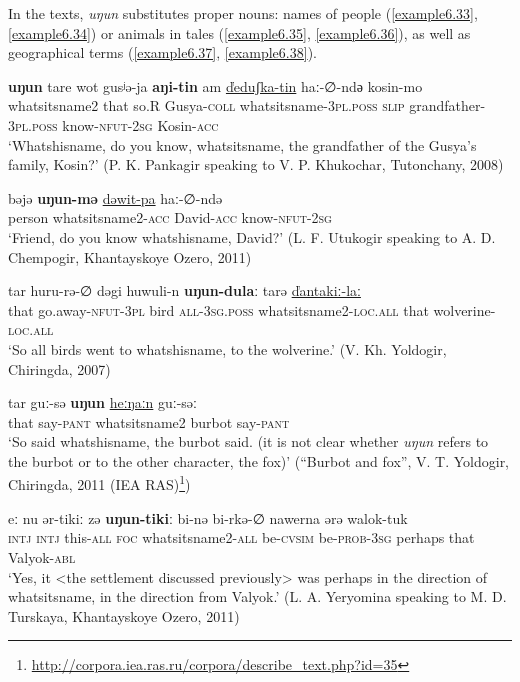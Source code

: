 \documentclass[output=paper,colorlinks,citecolor=brown]{langscibook}
\begin{document}
In the texts, \textit{uŋun} substitutes proper nouns: names of people (\ref{example6.33}, \ref{example6.34}) or animals in tales (\ref{example6.35}, \ref{example6.36}), as well as geographical terms (\ref{example6.37}, \ref{example6.38}).

\ea
    \label{example6.33}
    \gll \textbf{uŋun}	tare	wot	gusʲə-ja	\textbf{aŋi-tin} am	\uline{ďeduʃka-tin}	haː-∅-ndә	kosin-mo\\
    whatsitsname2	that	so.R	Gusya-\textsc{coll}	whatsitsname-\textsc{3pl.poss}  \textsc{slip}	grandfather-\textsc{3pl.poss}	know-\textsc{nfut}-2\textsc{sg}	Kosin-\textsc{acc}\\
    \glt `Whatshisname, do you know, whatsitsname, the grandfather of the Gusya’s family, Kosin?' (P. K. Pankagir speaking to V. P. Khukochar, Tutonchany, 2008)\\
    \z

\ea
    \label{example6.34}
    \gll bəjə	\textbf{uŋun-mə}	\uline{dəwit-pa}	haː-∅-ndə\\
    person	whatsitsname2-\textsc{acc}	David-\textsc{acc}	know-\textsc{nfut}-2\textsc{sg}\\
    \glt `Friend, do you know whatshisname, David?' (L. F. Utukogir speaking to A. D. Chempogir, Khantayskoye Ozero, 2011)\\
    \z

\ea
    \label{example6.35}
    \gll tar	huru-rə-∅	dəgi	huwuli-n	\textbf{uŋun-dulaː}	tarə    \uline{ďantakiː-laː}\\
    that	go.away-\textsc{nfut}-3\textsc{pl}	bird	\textsc{all}-\textsc{3sg.poss}	whatsitsname2-\textsc{loc.all}	that    wolverine-\textsc{loc.all}\\
    \glt `So all birds went to whatshisname, to the wolverine.' (V. Kh. Yoldogir, Chiringda, 2007)\\
    \z

\ea
    \label{example6.36}
    \gll tar	guː-sə	\textbf{uŋun}	\uline{heːŋaːn}	guː-səː\\
    that	say-\textsc{pant}	whatsitsname2	burbot	say-\textsc{pant}\\
    \glt `So said whatshisname, the burbot said. (it is not clear whether \textit{uŋun} refers to the burbot or to the other character, the fox)’ (“Burbot and fox”, V. T. Yoldogir, Chiringda, 2011 (IEA RAS)\footnote{  \url{http://corpora.iea.ras.ru/corpora/describe_text.php?id=35}})\\
    \z

\ea
    \label{example6.37}
    \gll eː	nu	ər-tikiː zə	\textbf{uŋun-tikiː}	bi-nə   bi-rkə-∅	nawerna	ərə	walok-tuk\\
    \textsc{intj}	\textsc{intj}	this-\textsc{all}	\textsc{foc}	whatsitsname2-\textsc{all}	be-\textsc{cvsim}    be-\textsc{prob}-3\textsc{sg}	perhaps	that	Valyok-\textsc{abl}\\
    \glt `Yes, it <the settlement discussed previously> was perhaps in the direction of whatsitsname, in the direction from Valyok.' (L. A. Yeryomina speaking to M. D. Turskaya, Khantayskoye Ozero, 2011)\\
    \z
\end{document}
